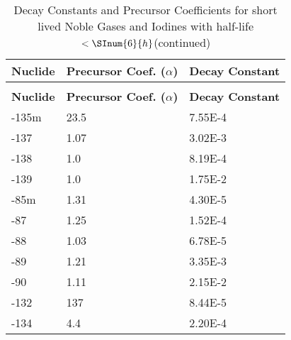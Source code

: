 \renewcommand{\captiontext}{Decay Constants and Precursor Coefficients for short lived Noble Gases
and Iodines with half-life $<\SInum{6}{h}$}
\begin{longtable}[c]{KA{4.0cm}K}     
    \caption{\captiontext} \label{tab:short_decay_constants_ans_fgr}    \\ \hline
        \textbf{Nuclide} & \textbf{Precursor Coef. ($\alpha$)} &             \textbf{Decay Constant} \\ \hline
    \endfirsthead
    \caption{\captiontext (continued)}    \\ \hline
        \textbf{Nuclide} & \textbf{Precursor Coef. ($\alpha$)} &             \textbf{Decay Constant} \\ \hline
    \endhead
        -135m          & 23.5                                &             \num{7.55E-4}\\
        -137           & 1.07                                &             \num{3.02E-3}\\
        -138           & 1.0                                 &             \num{8.19E-4}\\
        -139           & 1.0                                 &             \num{1.75E-2}\\
        -85m           & 1.31                                &             \num{4.30E-5}\\
        -87            & 1.25                                &             \num{1.52E-4}\\
        -88            & 1.03                                &             \num{6.78E-5}\\
        -89            & 1.21                                &             \num{3.35E-3}\\
        -90            & 1.11                                &             \num{2.15E-2}\\
        -132            & 137                                 &             \num{8.44E-5}\\
        -134            & 4.4                                 &             \num{2.20E-4}\\ 
\end{longtable}

